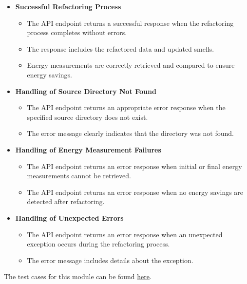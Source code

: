 \documentclass[12pt, titlepage]{article}
\begin{document}
  \begin{itemize}
    \item \textbf{Successful Refactoring Process}
      \begin{itemize}
        \item The API endpoint returns a successful response when the
          refactoring process completes without errors.
        \item The response includes the refactored data and updated smells.
        \item Energy measurements are correctly retrieved and
          compared to ensure energy savings.
      \end{itemize}

    \item \textbf{Handling of Source Directory Not Found}
      \begin{itemize}
        \item The API endpoint returns an appropriate error response
          when the specified source directory does not exist.
        \item The error message clearly indicates that the directory
          was not found.
      \end{itemize}

    \item \textbf{Handling of Energy Measurement Failures}
      \begin{itemize}
        \item The API endpoint returns an error response when initial
          or final energy measurements cannot be retrieved.
        \item The API endpoint returns an error response when no
          energy savings are detected after refactoring.
      \end{itemize}

    \item \textbf{Handling of Unexpected Errors}
      \begin{itemize}
        \item The API endpoint returns an error response when an
          unexpected exception occurs during the refactoring process.
        \item The error message includes details about the exception.
      \end{itemize}
  \end{itemize}

  \noindent The test cases for this module can be found
  \href{https://github.com/ssm-lab/capstone--source-code-optimizer/blob/new-poc/tests/api/test_refactoring.py}{here}.
\end{document}
